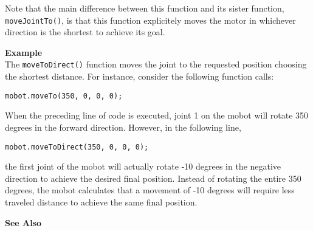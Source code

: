 Note that the main difference between this function and its sister function,
\texttt{moveJointTo()}, is that this function explicitely moves the motor in
whichever direction is the shortest to achieve its goal.

\noindent
{\bf Example}\\
The \texttt{moveToDirect()} function moves the joint to the requested position choosing
the shortest distance. For instance, consider the following function calls:
\begin{verbatim}
mobot.moveTo(350, 0, 0, 0);
\end{verbatim}
When the preceding line of code is executed, joint 1 on the mobot will rotate 350
degrees in the forward direction. However, in the following line,
\begin{verbatim}
mobot.moveToDirect(350, 0, 0, 0);
\end{verbatim}
the first joint of the mobot will actually rotate -10 degrees in the negative direction to achieve the
desired final position. Instead of rotating the entire 350 degrees, the mobot calculates
that a movement of -10 degrees will require less traveled distance to achieve the same final
position.\\
\noindent

\noindent
{\bf See Also}\\

